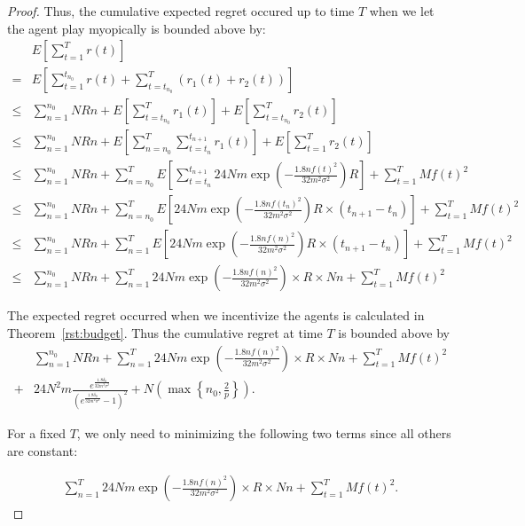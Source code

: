 \documentclass{article}
\begin{document}
\begin{proof}
Thus, the cumulative expected regret occured up to time $T$ when we let the agent play myopically is bounded above by:
\begin{align}
&E\left[\sum_{t=1}^{T}r(t)\right] \nonumber \\
=&E\left[\sum_{t=1}^{t_{n_{0}}} r(t) + \sum_{t=t_{n_{0}}}^{T}(r_1(t)+r_2(t))\right]  \nonumber \\
\leq & \sum_{n=1}^{n_{0}}NRn + E\left[\sum_{t=t_{n_{0}}}^{T}r_1(t)\right]+ E\left[\sum_{t=t_{n_{0}}}^{T}r_2(t)\right] \nonumber \\
\leq & \sum_{n=1}^{n_{0}}NRn + E\left[\sum_{n=n_{0}}^{T}\sum_{t=t_{n}}^{t_{n+1}}r_1(t)\right]+ E\left[\sum_{t=1}^{T}r_2(t)\right] \nonumber \\
\leq & \sum_{n=1}^{n_{0}}NRn + \sum_{n=n_{0}}^{T}E\left[\sum_{t=t_{n}}^{t_{n+1}}24Nm\exp\left(-\frac{1.8n f(t)^2}{32 m^2\sigma^2}\right) R\right]+ \sum_{t=1}^{T}Mf(t)^2 \nonumber \\
\leq & \sum_{n=1}^{n_{0}}NRn + \sum_{n=n_{0}}^{T}E\left[24Nm\exp\left(-\frac{1.8n f(t_n)^2}{32 m^2\sigma^2}\right)R \times (t_{n+1}-t_{n})\right]+ \sum_{t=1}^{T}Mf(t)^2 \nonumber \\
\leq & \sum_{n=1}^{n_{0}}NRn + \sum_{n=1}^{T}E\left[24Nm\exp\left(-\frac{1.8n f(n)^2}{32 m^2\sigma^2}\right)R\times (t_{n+1}-t_{n})\right]+ \sum_{t=1}^{T}Mf(t)^2 \nonumber \\
\leq & \sum_{n=1}^{n_{0}}NRn + \sum_{n=1}^{T} 24Nm\exp\left(-\frac{1.8n f(n)^2}{32 m^2\sigma^2}\right)\times R \times Nn+ \sum_{t=1}^{T}Mf(t)^2 \nonumber
\end{align}

The expected regret occurred when we incentivize the agents is calculated in Theorem~\ref{rst:budget}. Thus the cumulative regret at time $T$ is bounded above by
\begin{align}
&\sum_{n=1}^{n_{0}}NRn + \sum_{n=1}^{T} 24Nm\exp\left(-\frac{1.8n f(n)^2}{32 m^2\sigma^2}\right)\times R \times Nn+ \sum_{t=1}^{T}Mf(t)^2 \nonumber \\
+ & 24N^2 m \frac{e^{\frac{1.8\delta_{0}}{32m^2\sigma^2}}}{(e^{\frac{1.8\delta_{0}}{32m^2\sigma^2}}-1)^2}+N\left(\max\left\{n_{0},\frac{2}{p}\right\}\right). \nonumber
\end{align}

For a fixed $T$, we only need to minimizing the following two terms since all others are constant:

\begin{align}
\sum_{n=1}^{T} 24Nm\exp\left(-\frac{1.8n f(n)^2}{32 m^2\sigma^2}\right)\times R \times Nn+ \sum_{t=1}^{T}Mf(t)^2.
\end{align}



\end{proof}
\end{document}
